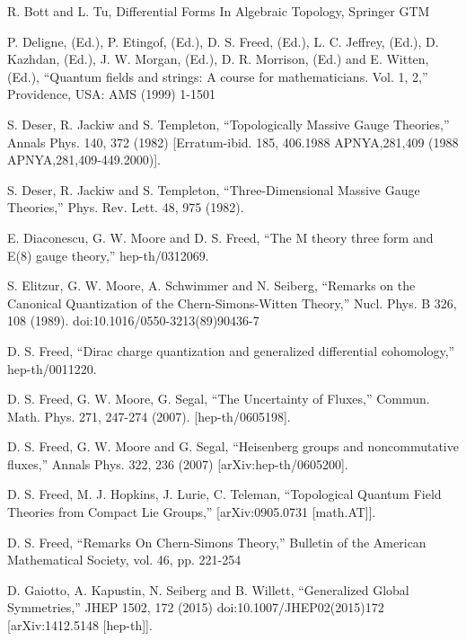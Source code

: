 \begin{enumerate}[label={[\arabic*]},leftmargin=3.2em,itemsep=2pt,topsep=4pt]
\item R. Bott and L. Tu, Differential Forms In Algebraic Topology, Springer GTM

\item P. Deligne, (Ed.), P. Etingof, (Ed.), D. S. Freed, (Ed.), L. C. Jeffrey, (Ed.), D. Kazhdan, (Ed.), J. W. Morgan, (Ed.), D. R. Morrison, (Ed.) and E. Witten, (Ed.), “Quantum fields and strings: A course for mathematicians. Vol. 1, 2,” Providence, USA: AMS (1999) 1-1501

\item S. Deser, R. Jackiw and S. Templeton, “Topologically Massive Gauge Theories,” Annals Phys. 140, 372 (1982) [Erratum-ibid. 185, 406.1988 APNYA,281,409 (1988 APNYA,281,409-449.2000)].

\item S. Deser, R. Jackiw and S. Templeton, “Three-Dimensional Massive Gauge Theories,” Phys. Rev. Lett. 48, 975 (1982).

\item E. Diaconescu, G. W. Moore and D. S. Freed, “The M theory three form and E(8) gauge theory,” hep-th/0312069.

\item S. Elitzur, G. W. Moore, A. Schwimmer and N. Seiberg, “Remarks on the Canonical Quantization of the Chern-Simons-Witten Theory,” Nucl. Phys. B 326, 108 (1989). doi:10.1016/0550-3213(89)90436-7

\item D. S. Freed, “Dirac charge quantization and generalized differential cohomology,” hep-th/0011220.

\item D. S. Freed, G. W. Moore, G. Segal, “The Uncertainty of Fluxes,” Commun. Math. Phys. 271, 247-274 (2007). [hep-th/0605198].

\item D. S. Freed, G. W. Moore and G. Segal, “Heisenberg groups and noncommutative fluxes,” Annals Phys. 322, 236 (2007) [arXiv:hep-th/0605200].

\item D. S. Freed, M. J. Hopkins, J. Lurie, C. Teleman, “Topological Quantum Field Theories from Compact Lie Groups,” [arXiv:0905.0731 [math.AT]].

\item D. S. Freed, “Remarks On Chern-Simons Theory,” Bulletin of the American Mathematical Society, vol. 46, pp. 221-254

\item D. Gaiotto, A. Kapustin, N. Seiberg and B. Willett, “Generalized Global Symmetries,” JHEP 1502, 172 (2015) doi:10.1007/JHEP02(2015)172 [arXiv:1412.5148 [hep-th]].


\end{enumerate}

